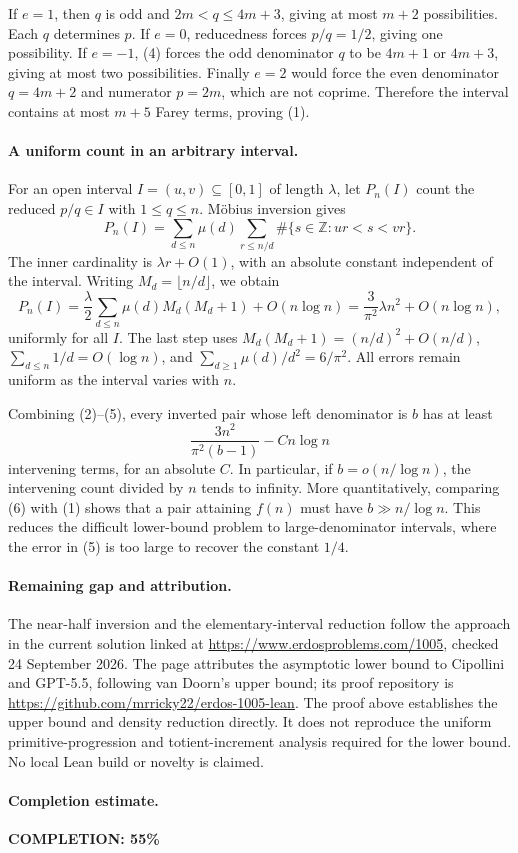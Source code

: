 If \(e=1\), then \(q\) is odd and \(2m<q\leq4m+3\), giving at most \(m+2\) possibilities. Each \(q\) determines \(p\).
If \(e=0\), reducedness forces \(p/q=1/2\), giving one possibility.
If \(e=-1\), (4) forces the odd denominator \(q\) to be \(4m+1\) or \(4m+3\), giving at most two possibilities.
Finally \(e=2\) would force the even denominator \(q=4m+2\) and numerator \(p=2m\), which are not coprime. Therefore the interval contains at most \(m+5\) Farey terms, proving (1).

\paragraph{A uniform count in an arbitrary interval.}
For an open interval \(I=(u,v)\subseteq[0,1]\) of length \(\lambda\), let \(P_n(I)\) count the reduced \(p/q\in I\) with \(1\leq q\leq n\). M\"obius inversion gives
\[
 P_n(I)=\sum_{d\leq n}\mu(d)
       \sum_{r\leq n/d}\#\{s\in\mathbb Z:ur<s<vr\}.
\]
The inner cardinality is \(\lambda r+O(1)\), with an absolute constant independent of the interval. Writing \(M_d=\lfloor n/d\rfloor\), we obtain
\[
 P_n(I)=\frac{\lambda}{2}
       \sum_{d\leq n}\mu(d)M_d(M_d+1)+O(n\log n)
       =\frac{3}{\pi^2}\lambda n^2+O(n\log n),
\tag{5}
\]
uniformly for all \(I\). The last step uses
\(M_d(M_d+1)=(n/d)^2+O(n/d)\),
\(\sum_{d\leq n}1/d=O(\log n)\), and
\(\sum_{d\geq1}\mu(d)/d^2=6/\pi^2\). All errors remain uniform as the interval varies with \(n\).

Combining (2)--(5), every inverted pair whose left denominator is \(b\) has at least
\[
 \frac{3n^2}{\pi^2(b-1)}-C n\log n
\tag{6}
\]
intervening terms, for an absolute \(C\). In particular, if \(b=o(n/\log n)\), the intervening count divided by \(n\) tends to infinity. More quantitatively, comparing (6) with (1) shows that a pair attaining \(f(n)\) must have \(b\gg n/\log n\). This reduces the difficult lower-bound problem to large-denominator intervals, where the error in (5) is too large to recover the constant \(1/4\).

\paragraph{Remaining gap and attribution.}
The near-half inversion and the elementary-interval reduction follow the approach in the current solution linked at \url{https://www.erdosproblems.com/1005}, checked 24 September 2026. The page attributes the asymptotic lower bound to Cipollini and GPT-5.5, following van Doorn's upper bound; its proof repository is \url{https://github.com/mrricky22/erdos-1005-lean}. The proof above establishes the upper bound and density reduction directly. It does not reproduce the uniform primitive-progression and totient-increment analysis required for the lower bound. No local Lean build or novelty is claimed.

\paragraph{Completion estimate.}
\textbf{COMPLETION: 55\%}
